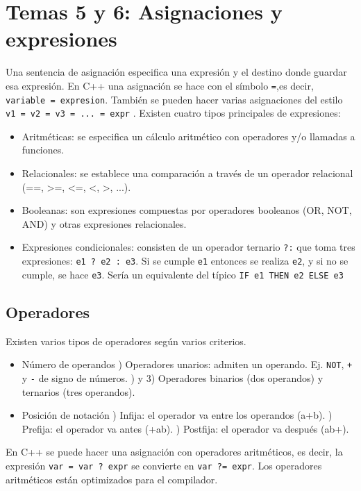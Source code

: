 \documentclass[a4paper]{article}
\begin{document}
	 \section{Temas 5 y 6: Asignaciones y expresiones}
	 Una sentencia de asignación especifica una expresión y el destino donde guardar esa expresión.
	 En C++ una asignación se hace con el símbolo \verb|=|,es decir, \verb|variable = expresion|. También se pueden hacer varias asignaciones del estilo \verb|v1 = v2 = v3 = ... = expr| . Existen cuatro tipos principales de expresiones:
	 \begin{itemize}
	 	\item Aritméticas: se especifica un cálculo aritmético con operadores y/o llamadas a funciones.
	 	\item Relacionales: se establece una comparación a través de un operador relacional (==, >=, <=, <, >, ...).
	 	\item Booleanas: son expresiones compuestas por operadores booleanos (OR, NOT, AND) y otras expresiones relacionales.
	 	\item Expresiones condicionales: consisten de un operador ternario \verb|?:| que toma tres expresiones: \verb|e1 ? e2 : e3|. Si se cumple \verb|e1| entonces se realiza \verb|e2|, y si no se cumple, se hace \verb|e3|. Sería un equivalente del típico \verb!IF e1 THEN e2 ELSE e3!
	 \end{itemize}

	\subsection{Operadores}
	Existen varios tipos de operadores según varios criterios.
	\begin{itemize}
		\item Número de operandos
			) Operadores unarios: admiten un operando. Ej. \verb|NOT|, \verb|+| y \verb|-| de signo de números.
			) y 3) Operadores binarios (dos operandos) y ternarios (tres operandos).
		\item Posición de notación
			) Infija: el operador va entre los operandos (a+b).
			) Prefija: el operador va antes (+ab).
			) Postfija: el operador va después (ab+).
	\end{itemize}
	
	En C++ se puede hacer una asignación con operadores aritméticos, es decir, la expresión \verb|var = var ? expr| se convierte en \verb|var ?= expr|. Los operadores aritméticos están optimizados para el compilador.
	
\end{document}
